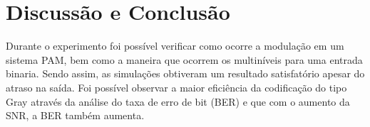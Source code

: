 \newpage
\section{Discussão e Conclusão}
Durante o experimento foi possível verificar como ocorre a modulação em um sistema PAM, bem como a maneira que ocorrem os multiníveis para uma entrada binaria. Sendo assim, as simulações obtiveram um resultado satisfatório apesar do atraso na saída. Foi possível observar a maior eficiência da codificação do tipo Gray através da análise do taxa de erro de bit (BER) e que com o aumento da SNR, a BER também aumenta. 